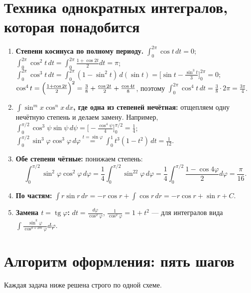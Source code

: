 \section{Техника однократных интегралов, которая понадобится}
\begin{enumerate}[label=\textbf{\arabic*.}]
\item \textbf{Степени косинуса по полному периоду.}
$\int_0^{2\pi}\cos t\,dt=0$;\quad
$\int_0^{2\pi}\cos^2t\,dt=\int_0^{2\pi}\frac{1+\cos2t}{2}dt=\pi$;\quad
$\int_0^{2\pi}\cos^3t\,dt=\int_0^{2\pi}(1-\sin^2t)\,d(\sin t)=\bigl[\sin t-\tfrac{\sin^3t}{3}\bigr]_0^{2\pi}=0$;\\
$\cos^4t=\Bigl(\frac{1+\cos2t}{2}\Bigr)^2=\frac38+\frac{\cos2t}{2}+\frac{\cos4t}{8}$, поэтому $\int_0^{2\pi}\cos^4t\,dt=\frac38\cdot2\pi=\frac{3\pi}{4}$.
\item \textbf{$\int\sin^m x\cos^n x\,dx$, где одна из степеней нечётная:} отщепляем одну нечётную степень и делаем замену. Например,
$\int_0^{\pi/2}\cos^3\psi\sin\psi\,d\psi=\bigl[-\tfrac{\cos^4\psi}{4}\bigr]_0^{\pi/2}=\tfrac14$;\quad
$\int_0^{\pi/2}\sin^3\varphi\cos^3\varphi\,d\varphi\overset{t=\sin\varphi}{=}\int_0^1t^3(1-t^2)\,dt=\tfrac1{12}$.
\item \textbf{Обе степени чётные:} понижаем степень:
\[\int_0^{\pi/2}\sin^2\varphi\cos^2\varphi\,d\varphi=\frac14\int_0^{\pi/2}\sin^22\varphi\,d\varphi=\frac14\int_0^{\pi/2}\frac{1-\cos4\varphi}{2}d\varphi=\frac{\pi}{16}.\]
\item \textbf{По частям:} $\int r\sin r\,dr=-r\cos r+\int\cos r\,dr=-r\cos r+\sin r+C$.
\item \textbf{Замена $t=\operatorname{tg}\varphi$:} $dt=\frac{d\varphi}{\cos^2\varphi}$, $\frac1{\cos^2\varphi}=1+t^2$ --- для интегралов вида $\int\frac{\sin^k\varphi}{\cos^{k+2m}\varphi}d\varphi$.
\end{enumerate}

\section{Алгоритм оформления: пять шагов}
Каждая задача ниже решена строго по одной схеме.

